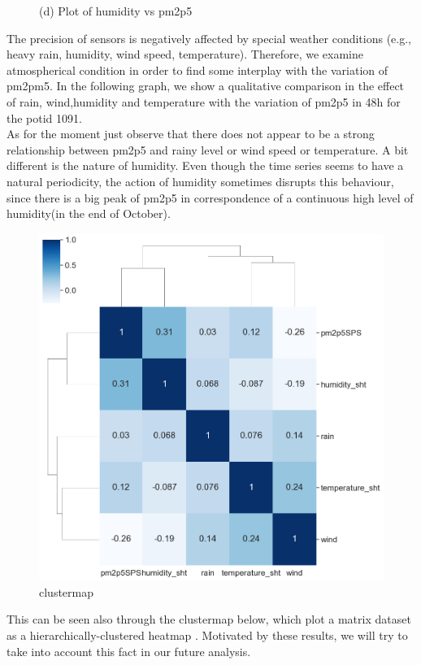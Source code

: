 \documentclass{article}
\begin{document}
\begin{figure}[h!]
\begin{minipage}[t]{0.4\textwidth}
      \caption{(d) Plot of humidity vs pm2p5}
    \end{minipage}
  \end{figure}
The precision of sensors is negatively affected by special weather conditions (e.g.,
heavy rain, humidity, wind speed, temperature). Therefore, we examine atmospherical condition in order to find some interplay with the variation of pm2pm5.
 In the following graph, we show a qualitative comparison in the effect of rain, wind,humidity and temperature with the variation of pm2p5 in 48h for the potid 1091. 
 \\As for the moment just observe that there does not appear to be a strong relationship between
pm2p5 and rainy level or wind speed or temperature. A bit different is the nature of humidity. Even though the time series seems to
have a natural periodicity, the action of humidity sometimes disrupts this behaviour, since there is a big peak of pm2p5
in correspondence of a continuous high level of humidity(in the end of October).
\begin{figure}
    \centering
    \includegraphics[scale=0.4]{correlations.png}
    \caption{clustermap}
\end{figure}

This can be seen also through the clustermap below, which plot a matrix dataset as a hierarchically-clustered heatmap . 
Motivated by these results, we will try to take into account this fact in our future analysis. 
\end{document}
